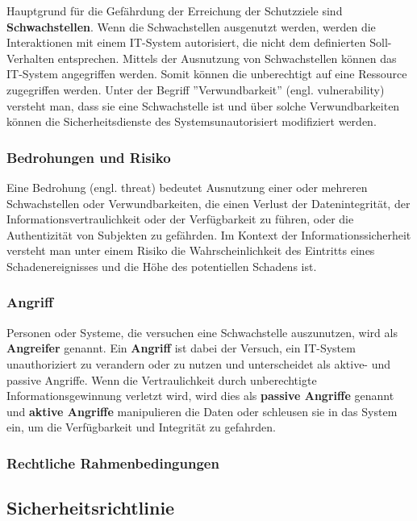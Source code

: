 Hauptgrund für die Gefährdung der Erreichung der Schutzziele sind \textbf{Schwachstellen}. Wenn die Schwachstellen ausgenutzt werden, werden die Interaktionen mit einem IT-System autorisiert, die nicht dem definierten Soll-Verhalten entsprechen. Mittels der Ausnutzung von Schwachstellen können das IT-System angegriffen werden. Somit können die unberechtigt auf eine Ressource zugegriffen werden\cite[19--20]{nowey2011einleitung}. Unter der Begriff ''Verwundbarkeit'' (engl. vulnerability) versteht man, dass sie eine Schwachstelle ist und über solche Verwundbarkeiten können die Sicherheitsdienste des Systemsunautorisiert modifiziert werden\cite[38]{eckert2013sicherheit}.

\subsubsection{Bedrohungen und Risiko}

Eine Bedrohung (engl. threat) bedeutet Ausnutzung  einer oder mehreren Schwachstellen oder Verwundbarkeiten, die einen Verlust der Datenintegrität, der Informationsvertraulichkeit oder der Verfügbarkeit zu führen, oder die Authentizität von Subjekten zu gefährden\cite[39]{eckert2013sicherheit}. Im Kontext der Informationssicherheit versteht man unter einem Risiko die Wahrscheinlichkeit des Eintritts eines Schadenereignisses und die Höhe des potentiellen Schadens ist\cite[15]{nowey2011einleitung}.

\subsubsection{Angriff}

Personen oder Systeme, die versuchen eine Schwachstelle auszunutzen, wird als \textbf{Angreifer} genannt. Ein \textbf{Angriff} ist dabei der Versuch, ein IT-System unauthoriziert zu verandern oder zu nutzen und unterscheidet als aktive- und passive Angriffe. Wenn die Vertraulichkeit durch unberechtigte Informationsgewinnung verletzt wird, wird dies als \textbf{passive Angriffe} genannt und \textbf{aktive Angriffe} manipulieren die Daten oder schleusen sie in das System ein, um die Verfügbarkeit und Integrität zu gefahrden\cite[20]{nowey2011einleitung}.

\subsubsection{Rechtliche Rahmenbedingungen}

\subsection{Sicherheitsrichtlinie}

